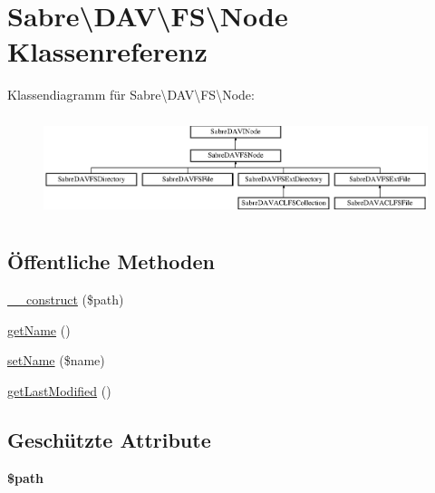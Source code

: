 \hypertarget{class_sabre_1_1_d_a_v_1_1_f_s_1_1_node}{}\section{Sabre\textbackslash{}D\+AV\textbackslash{}FS\textbackslash{}Node Klassenreferenz}
\label{class_sabre_1_1_d_a_v_1_1_f_s_1_1_node}
Klassendiagramm für Sabre\textbackslash{}D\+AV\textbackslash{}FS\textbackslash{}Node\+:\begin{figure}[H]
\begin{center}
\leavevmode
\includegraphics[height=2.947368cm]{class_sabre_1_1_d_a_v_1_1_f_s_1_1_node}
\end{center}
\end{figure}
\subsection*{Öffentliche Methoden}
\begin{DoxyCompactItemize}
\item 
\mbox{\hyperlink{class_sabre_1_1_d_a_v_1_1_f_s_1_1_node_ab1c055be79cb4d73713bbe9f4c601c01}{\+\_\+\+\_\+construct}} (\$path)
\item 
\mbox{\hyperlink{class_sabre_1_1_d_a_v_1_1_f_s_1_1_node_a9c17fc362b705fbd599512fcb32bafb9}{get\+Name}} ()
\item 
\mbox{\hyperlink{class_sabre_1_1_d_a_v_1_1_f_s_1_1_node_a9a4cd0359942b6640637502788bcc6d8}{set\+Name}} (\$name)
\item 
\mbox{\hyperlink{class_sabre_1_1_d_a_v_1_1_f_s_1_1_node_a3287f7faf6967fecf53a4afdec4d0a4b}{get\+Last\+Modified}} ()
\end{DoxyCompactItemize}
\subsection*{Geschützte Attribute}
\begin{DoxyCompactItemize}
\item 
\mbox{\label{class_sabre_1_1_d_a_v_1_1_f_s_1_1_node_a2d49eef9ef826b5579fe75503e612192}} 
{\bfseries \$path}
\end{DoxyCompactItemize}


